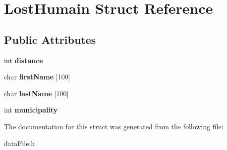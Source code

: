 \hypertarget{struct_lost_humain}{}\section{Lost\+Humain Struct Reference}
\label{struct_lost_humain}
\subsection*{Public Attributes}
\begin{DoxyCompactItemize}
\item 
\mbox{\label{struct_lost_humain_a93c5200b9c921f382197f59c846e88c1}} 
int {\bfseries distance}
\item 
\mbox{\label{struct_lost_humain_a2f03560037c43bf4d7137def77a0c0be}} 
char {\bfseries first\+Name} \mbox{[}100\mbox{]}
\item 
\mbox{\label{struct_lost_humain_a1c5a43680c48759882164e59693d2b74}} 
char {\bfseries last\+Name} \mbox{[}100\mbox{]}
\item 
\mbox{\label{struct_lost_humain_ab04348c078a59af9baa64f658f65ab21}} 
int {\bfseries municipality}
\end{DoxyCompactItemize}


The documentation for this struct was generated from the following file\+:\begin{DoxyCompactItemize}
\item 
data\+File.\+h\end{DoxyCompactItemize}

